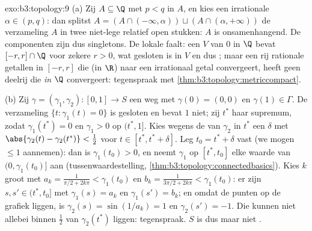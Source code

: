 \begin{solution}{exo:b3:topology:9}
(a) Zij $A \subseteq \Q$ met $p < q$ in $A$, en kies een
irrationale $\alpha \in (p, q)$: dan splitst $A = (A \cap
(-\infty, \alpha)) \sqcup (A\cap(\alpha, +\infty))$ de
verzameling $A$ in twee niet-lege relatief open stukken: $A$ is
onsamenhangend. De componenten zijn dus singletons. De lokale
 faalt: een   $V$ van $0$ in $\Q$ bevat
$[-r, r]\cap\Q$ voor zekere $r > 0$, wat gesloten is in $V$ en dus
; maar een rij rationale getallen in $[-r,r]$ die (in $\R$)
naar een irrationaal getal convergeert, heeft geen deelrij die
\emph{in $\Q$} convergeert: tegenspraak met
\cref{thm:b3:topology:metriccompact}.

(b) Zij $\gamma = (\gamma_1, \gamma_2) \colon [0,1] \to S$ een weg
met $\gamma(0) = (0,0)$ en $\gamma(1) \in \Gamma$. De verzameling
$\{t : \gamma_1(t) = 0\}$ is gesloten en bevat $1$ niet; zij $t^*$
haar supremum, zodat $\gamma_1(t^*) = 0$ en $\gamma_1 > 0$ op
$(t^*, 1]$. Kies wegens de  van $\gamma_2$ in $t^*$
een $\delta$ met $\abs{\gamma_2(t) - \gamma_2(t^*)} < \tfrac12$
voor $t \in [t^*, t^* + \delta]$. Leg $t_0 = t^* + \delta$ vast
(we mogen $\leq 1$ aannemen): dan is $\gamma_1(t_0) > 0$, en neemt
$\gamma_1$ op $[t^*, t_0]$ elke waarde van $(0, \gamma_1(t_0)]$
aan (tussenwaardestelling,
\cref{thm:b3:topology:connectedbasics}). Kies $k$ groot met $a_k =
\frac1{\pi/2 + 2k\pi} < \gamma_1(t_0)$ en $b_k = \frac1{3\pi/2 +
2k\pi} < \gamma_1(t_0)$: er zijn $s, s' \in (t^*, t_0]$ met
$\gamma_1(s) = a_k$ en $\gamma_1(s') = b_k$; en omdat de punten op
de grafiek liggen, is $\gamma_2(s) = \sin(1/a_k) = 1$ en
$\gamma_2(s') = -1$. Die kunnen niet allebei binnen $\frac12$ van
$\gamma_2(t^*)$ liggen: tegenspraak. $S$ is dus  maar
niet .
\end{solution}

